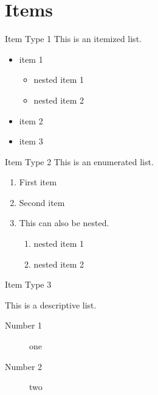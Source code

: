 \section{Items}
\begin{frame}{Item Type 1}
This is an itemized list.
\begin{itemize}
    \item item 1
    \begin{itemize}
        \item nested item 1
        \item nested item 2
    \end{itemize}
    \item item 2
    \item item 3
\end{itemize}
\end{frame}

\begin{frame}{Item Type 2}
    This is an enumerated list.
\begin{enumerate}
    \item First item
    \item Second item
    \item This can also be nested.
    \begin{enumerate}
        \item nested item 1
        \item nested item 2
    \end{enumerate}
\end{enumerate}
\end{frame}

\begin{frame}{Item Type 3}

This is a descriptive list.
\begin{description}
\item[Number 1] one
\item[Number 2] two
\end{description}
    
\end{frame}